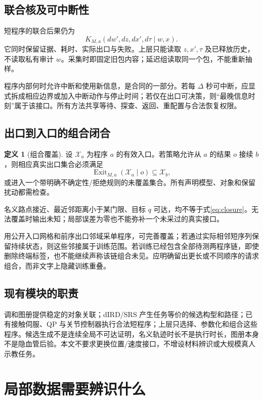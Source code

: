 \documentclass[11pt,a4paper,fontset=fandol]{ctexart}
\theoremstyle{definition}
\newtheorem{definition}[theorem]{定义}
\theoremstyle{remark}\newtheorem{remark}[theorem]{说明}
\numberwithin{equation}{section}
\begin{document}
\subsection{联合核及可中断性}
短程序的联合后果仍为
\begin{equation}
 K_{M,a}(dw',dz,dx',d\tau\mid w,x).
 \label{eq:kernel}
\end{equation}
它同时保留证据、耗时、实际出口与失败。上层只能读取 $z,x',\tau$ 及已释放历史，不读取私有审计 $w$。采集时即固定旧包内容；延迟组读取同一个包，不能重新抽样。

程序内部何时允许中断和使用新信息，是合同的一部分。若每 $\Delta$ 秒可中断，应显式拆成相应边界或加入中断动作与停止时间；若仅在出口可决策，则“最晚信息时刻”属于该接口。所有方法共享等待、探查、返回、重配置与合法恢复权限。

\subsection{出口到入口的组合闭合}
\begin{definition}[组合覆盖]
设 $\mathcal X_a$ 为程序 $a$ 的有效入口。若策略允许从 $a$ 的结果 $o$ 接续 $b$，则相应真实出口集合必须满足
\begin{equation}
 \operatorname{Exit}_{M,a}(\mathcal X_a\mid o)
 \subseteq \mathcal X_b,
 \label{eq:closure}
\end{equation}
或进入一个带明确不确定性/拒绝规则的未覆盖集合。所有声明模型、对象和保留扰动都需检查。
\end{definition}
名义路点接近、最近邻距离小于某门限、目标 $q$ 可达，均不等于式\eqref{eq:closure}。无法覆盖时输出未知；局部误差为零也不能弥补一个未采过的真实接口。

用公开入口网格和前序出口邻域采单程序，可完善覆盖；若通过实际相邻短序列保留持续状态，则这些邻接属于训练范围。若训练已经包含全部待测两程序链，即使删除终端标签，也不能继续声称该链组合未见。应明确留出更长或不同顺序的请求组合，而非文字上隐藏训练重叠。

\subsection{现有模块的职责}
调和图册提供稳定的对象关联；dIRD/SRS 产生任务等价的候选构型和路径；已有接触伺服、QP 与关节控制器执行合法短程序；上层只选择、参数化和组合这些程序。候选生成不是连续全局不可达证明，名义轨迹时长不是执行时长，图册本身不是隐血管后验。本文不要求更换位置/速度接口，不增设材料辨识或大规模真人示教任务。

\section{局部数据需要辨识什么}
\label{sec:learning}
\end{document}
